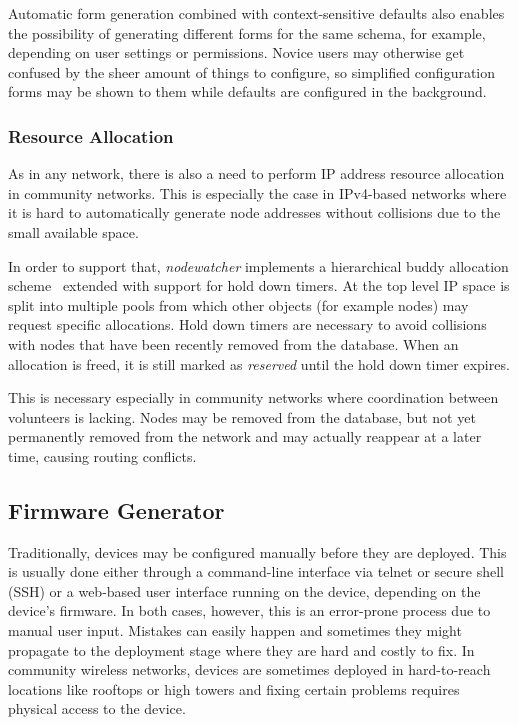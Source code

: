 \documentclass[5p,sort&compress]{elsarticle}
\newcommand{\nodewatcher}{\textit{nodewatcher}}
\begin{document}
Automatic form generation combined with context-sensitive defaults also enables the possibility of generating different forms for the same schema, for example, depending on user settings or permissions.
Novice users may otherwise get confused by the sheer amount of things to configure, so simplified configuration forms may be shown to them while defaults are configured in the background.

\subsubsection{Resource Allocation}
\label{sec:resource-allocation}

As in any network, there is also a need to perform IP address resource allocation in community networks.
This is especially the case in IPv4-based networks where it is hard to automatically generate node addresses without collisions due to the small available space.

In order to support that, \nodewatcher{} implements a hierarchical buddy allocation scheme~\cite{Peterson_1977} extended with support for hold down timers.
At the top level IP space is split into multiple pools from which other objects (for example nodes) may request specific allocations.
Hold down timers are necessary to avoid collisions with nodes that have been recently removed from the database.
When an allocation is freed, it is still marked as \textit{reserved} until the hold down timer expires.

This is necessary especially in community networks where coordination between volunteers is lacking.
Nodes may be removed from the database, but not yet permanently removed from the network and may actually reappear at a later time, causing routing conflicts.

\subsection{Firmware Generator}
\label{sec:firmware-generator}

Traditionally, devices may be configured manually before they are deployed.
This is usually done either through a command-line interface via telnet or secure shell (SSH) or a web-based user interface running on the device, depending on the device's firmware.
In both cases, however, this is an error-prone process due to manual user input.
Mistakes can easily happen and sometimes they might propagate to the deployment stage where they are hard and costly to fix.
In community wireless networks, devices are sometimes deployed in hard-to-reach locations like rooftops or high towers and fixing certain problems requires physical access to the device.
\end{document}
